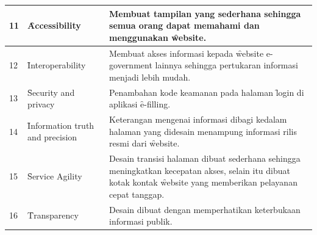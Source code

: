 \begin{center}
\begin{longtable}{|p{0.5cm}|p{4.5cm}|p{6.5cm}|}
		11 & \f{Accessibility} & Membuat tampilan yang sederhana sehingga semua orang dapat memahami dan menggunakan \f{website}. \\ \hline
		12 & \f{Interoperability} & Membuat akses informasi kepada \f{website e-government} lainnya sehingga pertukaran informasi menjadi lebih mudah. \\ \hline
		13 & \f{Security and privacy} & Penambahan kode keamanan pada halaman \f{login} di aplikasi \f{e-filling}. \\ \hline
		14 & \f{Information truth and precision} & Keterangan mengenai informasi dibagi kedalam halaman yang didesain menampung informasi rilis resmi dari \f{website}. \\ \hline
		15 & \f{Service Agility} & Desain transisi halaman dibuat sederhana sehingga meningkatkan kecepatan akses, selain itu dibuat kotak kontak \f{website} yang memberikan pelayanan cepat tanggap. \\ \hline
		16 & \f{Transparency} & Desain dibuat dengan memperhatikan keterbukaan informasi publik. \\ \hline
	\end{longtable}
\end{center}

